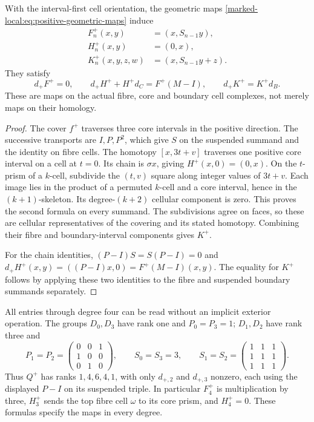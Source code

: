 \begin{theorem}\label{marked-local:thm:positive-chains}
With the interval-first cell orientation, the geometric maps
\eqref{marked-local:eq:positive-geometric-maps} induce
\begin{equation}\label{marked-local:eq:positive-FHK}
 \begin{split}
 F^+_n(x,y)&=(x,S_{n-1}y),\\
 H^+_n(x,y)&=(0,x),\\
 K^+_n(x,y,z,w)&=(x,S_{n-1}y+z).
 \end{split}
\end{equation}
They satisfy
\begin{equation}\label{marked-local:eq:positive-identities}
 d_+F^+=0,\qquad d_+H^++H^+d_C=F^+(M-I),
 \qquad d_+K^+=K^+d_B.
\end{equation}
These are maps on the actual fibre, core and boundary cell complexes,
not merely maps on their homology.
\end{theorem}
\begin{proof}
The cover $f^+$ traverses three core intervals in the positive
direction. The successive transports are $I,P,P^2$, which give
$S$ on the suspended summand and the identity on fibre cells.
The homotopy $[x,3t+v]$ traverses one positive core interval on
a cell at $t=0$. Its chain is $\sigma x$, giving $H^+(x,0)=(0,x)$.
On the $t$-prism of a $k$-cell, subdivide the $(t,v)$ square along
integer values of $3t+v$. Each image lies in the product of a
permuted $k$-cell and a core interval, hence in the $(k+1)$-skeleton.
Its degree-$(k+2)$ cellular component is zero. This proves the second
formula on every summand. The subdivisions agree on faces, so these
are cellular representatives of the covering and its stated homotopy.
Combining their fibre and boundary-interval components gives $K^+$.

For the chain identities, $(P-I)S=S(P-I)=0$ and
$d_+H^+(x,y)=((P-I)x,0)=F^+(M-I)(x,y)$.
The equality for $K^+$ follows by applying these two identities to
the fibre and suspended boundary summands separately.
\end{proof}

All entries through degree four can be read without an implicit
exterior operation. The groups $D_0,D_3$ have rank one and
$P_0=P_3=1$; $D_1,D_2$ have rank three and
\[
 P_1=P_2=\begin{pmatrix}0&0&1\\1&0&0\\0&1&0\end{pmatrix},
 \qquad S_0=S_3=3,\qquad
 S_1=S_2=\begin{pmatrix}1&1&1\\1&1&1\\1&1&1\end{pmatrix}.
\]
Thus $Q^+$ has ranks $1,4,6,4,1$, with only $d_{+,2}$ and
$d_{+,3}$ nonzero, each using the displayed $P-I$ on its suspended
triple. In particular $F^+_4$ is multiplication by three, $H^+_3$
sends the top fibre cell $\omega$ to its core prism, and $H^+_4=0$.
These formulas specify the maps in every degree.

